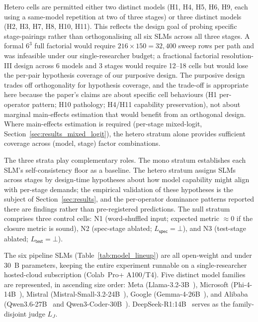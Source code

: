 Hetero cells are permitted either two distinct models (H1, H4, H5, H6, H9, each using a same-model repetition at two of three stages) or three distinct models (H2, H3, H7, H8, H10, H11). This reflects the design goal of probing specific stage-pairings rather than orthogonalising all six SLMs across all three stages. A formal $6^3$ full factorial would require $216 \times 150 = 32{,}400$ sweep rows per path and was infeasible under our single-researcher budget; a fractional factorial resolution-III design across 6 models and 3 stages would require 12--18 cells but would lose the per-pair hypothesis coverage of our purposive design. The purposive design trades off orthogonality for hypothesis coverage, and the trade-off is appropriate here because the paper's claims are about specific cell behaviours (H1 per-operator pattern; H10 pathology; H4/H11 capability preservation), not about marginal main-effects estimation that would benefit from an orthogonal design. Where main-effects estimation is required (per-stage mixed-logit, Section~\ref{sec:results_mixed_logit}), the hetero stratum alone provides sufficient coverage across (model, stage) factor combinations.

The three strata play complementary roles. The mono stratum establishes each SLM's self-consistency floor as a baseline. The hetero stratum assigns SLMs across stages by design-time hypotheses about how model capability might align with per-stage demands; the empirical validation of these hypotheses is the subject of Section~\ref{sec:results}, and the per-operator dominance patterns reported there are findings rather than pre-registered predictions. The null stratum comprises three control cells: N1 (word-shuffled input; expected metric $\approx 0$ if the closure metric is sound), N2 (spec-stage ablated; $L_{\textsf{spec}} = \bot$), and N3 (test-stage ablated; $L_{\textsf{test}} = \bot$).

The six pipeline SLMs (Table~\ref{tab:model_lineup}) are all open-weight and under 30~B parameters, keeping the entire experiment runnable on a single-researcher hosted-cloud subscription (Colab~Pro+ A100/T4). Five distinct model families are represented, in ascending size order: Meta (Llama-3.2-3B~\citep{Llama32}), Microsoft (Phi-4-14B~\citep{Phi4}), Mistral (Mistral-Small-3.2-24B~\citep{MistralSmall}), Google (Gemma-4-26B~\citep{Gemma4}), and Alibaba (Qwen3.6-27B~\citep{Qwen36} and Qwen3-Coder-30B~\citep{QwenCoder}). DeepSeek-R1:14B~\citep{DeepSeekR1} serves as the family-disjoint judge $L_J$.

